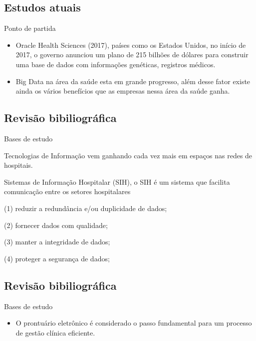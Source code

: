 \documentclass{beamer}
\begin{document}
\subsection{Estudos atuais}
\begin{frame}{Ponto de partida}
\begin{itemize}
    \item {Oracle Health Sciences (2017), países como os Estados Unidos, no início de 2017, o governo anunciou um plano de  215 bilhões de dólares para construir uma base de dados com informações genéticas, registros médicos.}
    \item {Big Data na área da saúde esta em grande progresso, além desse fator existe ainda os vários benefícios que as empresas nessa área da saúde ganha. }

\end{itemize}
\end{frame}


\subsection{Revisão bibiliográfica}
\begin{frame}{Bases de estudo}
\begin{itemize}
    \item {Tecnologias de Informação vem ganhando cada vez mais em espaços nas redes de hospitais. }
    \item {Sistemas de Informação Hospitalar (SIH), o SIH é um sistema que facilita comunicação entre os setores hospitalares }
    \item {(1) reduzir a redundância e/ou duplicidade de dados; 
    \item (2) fornecer dados com qualidade; 
    \item (3) manter a integridade de dados;
    \item (4) proteger a segurança de dados; 
}
\end{itemize}
\end{frame}

\subsection{Revisão bibiliográfica}
\begin{frame}{Bases de estudo}
\begin{itemize}
    \item {O prontuário eletrônico é considerado o passo fundamental para um processo de gestão clínica eficiente. }
\end{itemize}
\end{frame}
\end{document}
